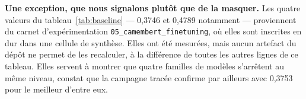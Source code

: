 \textbf{Une exception, que nous signalons plutôt que de la masquer.} Les quatre valeurs du
tableau~\ref{tab:baseline} — 0,3746 et 0,4789 notamment — proviennent du carnet d'expérimentation
\texttt{05\_camembert\_finetuning}, où elles sont inscrites en dur dans une cellule de synthèse.
Elles ont été mesurées, mais aucun artefact du dépôt ne permet de les recalculer, à la différence
de toutes les autres lignes de ce tableau. Elles servent à montrer que quatre familles de modèles
s'arrêtent au même niveau, constat que la campagne tracée confirme par ailleurs avec 0,3753 pour le
meilleur d'entre eux.

\FloatBarrier
